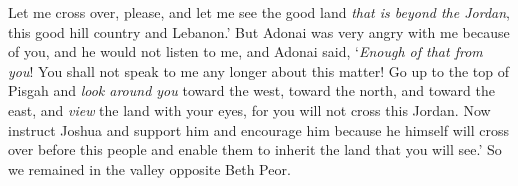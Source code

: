 \begin{biblechapter}
\verse Let me cross over, please, and let me see the good land \textit{that is beyond the Jordan}, this good hill country and Lebanon.’
\verse But Adonai was very angry with me because of you, and he would not listen to me, and Adonai said, ‘\textit{Enough of that from you}! You shall not speak to me any longer about this matter!
\verse Go up to the top of Pisgah and \textit{look around you} toward the west, toward the north, and toward the east, and \textit{view} the land with your eyes, for you will not cross this Jordan.
\verse Now instruct Joshua and support him and encourage him because he himself will cross over before this people and enable them to inherit the land that you will see.’
\verse So we remained in the valley opposite Beth Peor.
\end{biblechapter}

